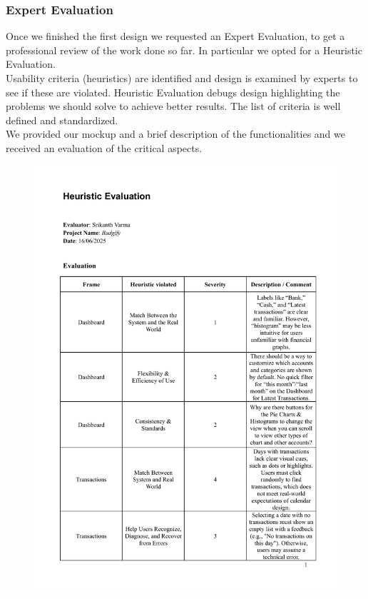 \documentclass[a4paper,12pt]{article}
\begin{document}
\subsubsection{Expert Evaluation}
Once we finished the first design we requested an Expert Evaluation, to get a professional review of the work done so far. In particular we opted for a Heuristic Evaluation.
\vspace{0.5cm}\\
Usability criteria (heuristics) are identified and design is examined by experts to see if these are
violated. Heuristic Evaluation debugs design highlighting the problems we should solve to achieve better results. The list of criteria is well defined and standardized.\\
We provided our mockup and a brief description of the functionalities and we received an evaluation of the critical aspects.
\begin{figure}[H]
    \centering
    \includegraphics[width=1\linewidth]{HE1.pdf}
\end{figure}
\end{document}
